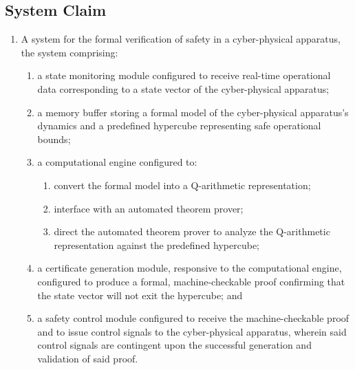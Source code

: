 \documentclass{article}
\begin{document}
\subsection*{System Claim}
\begin{enumerate}
    \item A system for the formal verification of safety in a cyber-physical apparatus, the system comprising:
    \begin{enumerate}
        \item a state monitoring module configured to receive real-time operational data corresponding to a state vector of the cyber-physical apparatus;
        \item a memory buffer storing a formal model of the cyber-physical apparatus's dynamics and a predefined hypercube representing safe operational bounds;
        \item a computational engine configured to:
        \begin{enumerate}
            \item convert the formal model into a Q-arithmetic representation;
            \item interface with an automated theorem prover;
            \item direct the automated theorem prover to analyze the Q-arithmetic representation against the predefined hypercube;
        \end{enumerate}
        \item a certificate generation module, responsive to the computational engine, configured to produce a formal, machine-checkable proof confirming that the state vector will not exit the hypercube; and
        \item a safety control module configured to receive the machine-checkable proof and to issue control signals to the cyber-physical apparatus, wherein said control signals are contingent upon the successful generation and validation of said proof.
    \end{enumerate}
\end{enumerate}
\end{document}
